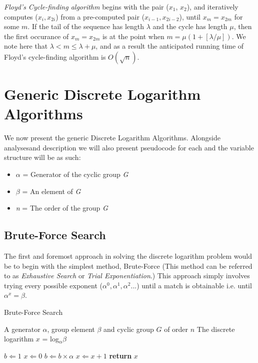 \documentclass[iwp,first]{luthesis}
\begin{document}
\textit{Floyd's Cycle-finding algorithm} begins with the pair ($x_1$, $x_2$), and iteratively computes ($x_i, x_{2i}$) from a pre-computed pair ($x_{i-1}, x_{2i-2}$), until $x_m = x_{2m}$ for some $m$. If the tail of the sequence has length $\lambda$ and the cycle has length $\mu$, then the first occurance of $x_m = x_{2m}$ is at the point when $m = \mu(1+[\lambda/\mu])$. We note here that $\lambda < m \leq \lambda + \mu$, and as a result the anticipated running time of Floyd's cycle-finding algorithm is $O(\sqrt{n})$.

\section{Generic Discrete Logarithm Algorithms}

We now present the generic Discrete Logarithm Algorithms. Alongside analysesand description we will also present pseudocode for each and the variable structure will be as such:

\begin{itemize}
\item $\alpha$ = Generator of the cyclic group \textit{G}
\item $\beta$ = An element of \textit{G}
\item \textit{n} = The order of the group \textit{G}
\end{itemize}

\newpage 

\subsection{Brute-Force Search}

The first and foremost approach in solving the discrete logarithm problem would be to begin with the simplest method, Brute-Force (This method can be referred to as \textit{Exhaustive Search} or \textit{Trial Exponentiation}.) This approach simply involves trying every possible exponent ($\alpha^0, \alpha^1, \alpha^2...$) until a match is obtainable i.e. until $\alpha^x = \beta$. 

\begin{algorithm}
\caption{Brute-Force Search}
\begin{algorithmic}
\REQUIRE A generator $\alpha$, group element $\beta$ and cyclic group $G$ of order $n$
\ENSURE The discrete logarithm $x$ = log$_{\alpha}\beta$
\begin{enumerate}
\STATE $b \Leftarrow 1$
\STATE $x \Leftarrow 0$
\STATE $b \Leftarrow b \times \alpha$
\STATE $x \Leftarrow x + 1$
\ENDWHILE
\STATE \textbf{return} $x$
\end{enumerate}
\end{algorithmic}
\end{algorithm}
\end{document}
